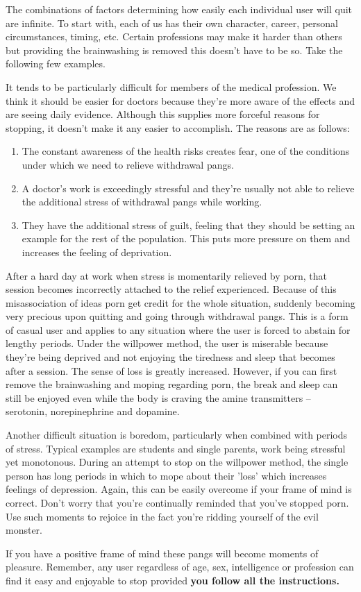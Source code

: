 \documentclass[easypeasy.tex]{subfiles}
\begin{document}
The combinations of factors determining how easily each individual user will quit are infinite. To start with, each of us has their own character, career, personal circumstances, timing, etc. Certain professions may make it harder than others but providing the brainwashing is removed this doesn't have to be so. Take the following few examples.

It tends to be particularly difficult for members of the medical profession. We think it should be easier for doctors because they're more aware of the effects and are seeing daily evidence. Although this supplies more forceful reasons for stopping, it doesn't make it any easier to accomplish. The reasons are as follows:
  \begin{enumerate}
  \item The constant awareness of the health risks creates fear, one of the conditions under which we need to relieve withdrawal pangs.

  \item A doctor's work is exceedingly stressful and they're usually not able to relieve the additional stress of withdrawal pangs while working.

  \item They have the additional stress of guilt, feeling that they should be setting an example for the rest of the population. This puts more pressure on them and increases the feeling of deprivation.
\end{enumerate}
After a hard day at work when stress is momentarily relieved by porn, that session becomes incorrectly attached to the relief experienced. Because of this misassociation of ideas porn get credit for the whole situation, suddenly becoming very precious upon quitting and going through withdrawal pangs. This is a form of casual user and applies to any situation where the user is forced to abstain for lengthy periods. Under the willpower method, the user is miserable because they're being deprived and not enjoying the tiredness and sleep that becomes after a session. The sense of loss is greatly increased. However, if you can first remove the brainwashing and moping regarding porn, the break and sleep can still be enjoyed even while the body is craving the amine transmitters -- serotonin, norepinephrine and dopamine.

Another difficult situation is boredom, particularly when combined with periods of stress. Typical examples are students and single parents, work being stressful yet monotonous. During an attempt to stop on the willpower method, the single person has long periods in which to mope about their 'loss' which increases feelings of depression. Again, this can be easily overcome if your frame of mind is correct. Don't worry that you're continually reminded that you've stopped porn. Use such moments to rejoice in the fact you're ridding yourself of the evil monster.

If you have a positive frame of mind these pangs will become moments of pleasure. Remember, any user regardless of age, sex, intelligence or profession can find it easy and enjoyable to stop provided \textbf{you follow all the instructions.}
\end{document}
